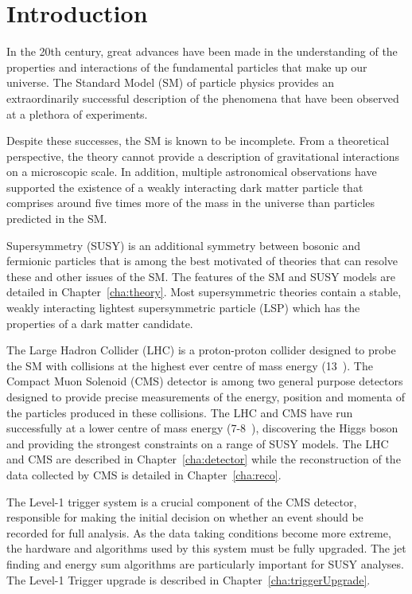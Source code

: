 \chapter{Introduction}
\label{cha:introduction}

In the 20th century, great advances have been made in the
understanding of the properties and interactions of 
the fundamental particles that make up our universe. 
The Standard Model (SM) of particle physics provides an 
extraordinarily successful description of the phenomena 
that have been observed at a plethora of experiments.

Despite these successes, the SM is known to be incomplete.
From a theoretical perspective, the theory cannot provide a description of gravitational
interactions on a microscopic scale. In addition, multiple astronomical observations 
have supported the existence of a weakly interacting dark matter particle that
comprises around five times more of the mass in the universe than particles 
predicted in the SM.

Supersymmetry (SUSY) is an additional symmetry between bosonic and fermionic particles 
that is among the best motivated of theories that can resolve these
and other issues of the SM. The features of the SM and SUSY models are detailed 
in Chapter~\ref{cha:theory}. Most supersymmetric theories contain a stable,
weakly interacting lightest supersymmetric particle (LSP) which has the properties 
of a dark matter candidate.

The Large Hadron Collider (LHC) is a proton-proton collider designed to probe the 
SM with collisions at the highest ever centre of mass energy (13~\TeV).
The Compact Muon Solenoid (CMS) detector is among two general purpose detectors
designed to provide precise measurements of the energy, position and momenta of
the particles produced in these collisions. The LHC and CMS have run successfully at a lower centre of 
mass energy (7-8~\TeV), discovering the Higgs boson and providing the strongest 
constraints on a range of SUSY models. The LHC and CMS are described in Chapter~\ref{cha:detector}
while the reconstruction of the data collected by CMS is detailed in Chapter~\ref{cha:reco}.

The Level-1 trigger system is a crucial component of the CMS detector, responsible 
for making the initial decision on whether an event should be recorded 
for full analysis. As the data taking conditions become more extreme, the hardware
and algorithms used by this system must be fully upgraded. The jet finding and energy sum algorithms 
are particularly important for SUSY analyses. The Level-1 Trigger upgrade is described in 
Chapter~\ref{cha:triggerUpgrade}. 

